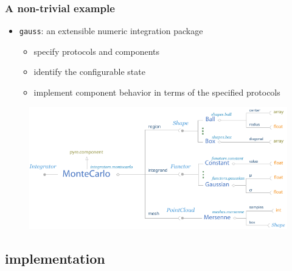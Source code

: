 \begin{frame}
%
  \frametitle{A non-trivial example}
%
  \begin{itemize}
  \item {\tt gauss}: an extensible numeric integration package
    \begin{itemize}
      \item specify protocols and components
      \item identify the configurable state
      \item implement component behavior in terms of the specified protocols
    \end{itemize}
  \end{itemize}
%
  \begin{figure}
    \includegraphics[scale=1.0]{figures/montecarlo.pdf}
  \end{figure}
%
\end{frame}


\subsection{implementation}


